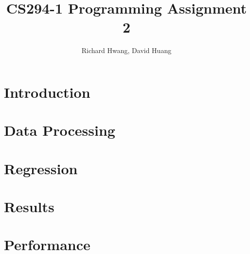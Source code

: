 \documentclass[11pt]{article}
\title{CS294-1 Programming Assignment 2}
\author{Richard Hwang, David Huang}
\begin{document}
\maketitle

\section{Introduction}

\section{Data Processing}

\section{Regression}

\section{Results}

\section{Performance}
\end{document}
